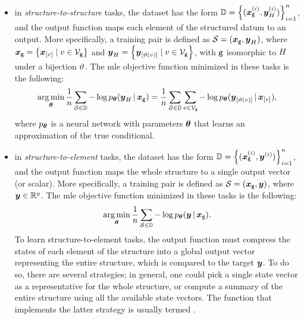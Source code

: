 \begin{itemize}
    \item in \emph{structure-to-structure} tasks, the dataset has the form $\Data = \Set{(\Vector{x}_{\Graph{g}}^{(i)}, \Vector{y}_H^{(i)})}_{i=1}^n$, and the output function maps each element of the structured datum to an output. More specifically, a training pair is defined as $\Cal{S} = (\Vector{x}_{\Graph{g}}, \Vector{y}_H)$, where $\Vector{x}_{\Graph{g}}= \Set{\Elem{x}{v} \mid v \in \Nodes_{\Graph{g}}}$ and $\Vector{y}_H = \Set{\Elem{y}{\Isomorph(v)} \mid v \in \Nodes_{\Graph{g}}}$, with $\mathtt{g}$ isomorphic to $H$ under a bijection $\vartheta$. The \gls{mle} objective function minimized in these tasks is the following:
    $$\argmin_{\Param} \frac{1}{n} \sum_{\Cal{S} \in \Data} - \log p_{\Param}(\Vector{y}_H \given \Vector{x}_{\Graph{g}}) = \frac{1}{n}\sum_{\Cal{S} \in \Data} \sum_{v \in \Nodes_{\Graph{g}}} - \log p_{\Param}(\Elem{y}{\Isomorph(v)} \given \Elem{x}{v}),$$
    where $p_{\boldsymbol{\theta}}$ is a neural network with parameters $\boldsymbol{\theta}$ that learns an approximation of the true conditional.
    \item in \emph{structure-to-element} tasks, the dataset has the form $\Data = \Set{(\Vector{x}_{\Graph{g}}^{(i)}, \Vector{y}^{(i)})}_{i=1}^n$, and the output function maps the whole structure to a single output vector (or scalar). More specifically, a training pair is defined as $\Cal{S} = (\Vector{x}_{\Graph{g}}, \Vector{y})$, where $\Vector{y} \in \Real^y$. The \gls{mle} objective function minimized in these tasks is the following:
    $$\argmin_{\Param} \frac{1}{n} \sum_{\Cal{S} \in \Data} - \log p_{\Param}(\Vector{y} \given \Vector{x}_{\Graph{g}}).$$
    To learn structure-to-element tasks, the output function must compress the states of each element of the structure into a global output vector representing the entire structure, which is compared to the target $\Vector{y}$. To do so, there are several strategies; in general, one could pick a single state vector as a representative for the whole structure, or compute a summary of the entire structure using all the available state vectors. The function that implements the latter strategy is usually termed .
\end{itemize}

